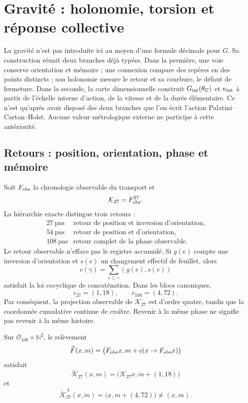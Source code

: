 \chapter{Gravité : holonomie, torsion et réponse collective}
\label{chap:gravedad}

La gravité n'est pas introduite ici au moyen d'une formule décimale pour \(G\).
Sa construction réunit deux branches déjà typées. Dans la première, une voie conserve
orientation et mémoire ; une connexion compare des repères en des points distincts ; son
holonomie mesure le retour et sa courbure, le défaut de fermeture. Dans la seconde,
la carte dimensionnelle construit \(G_{\rm int}(\theta_G)\) et
\(\kappa_{\rm int}\) à partir de l'échelle interne d'action, de la vitesse et
de la durée élémentaire. Ce n'est qu'après avoir disposé des deux branches que l'on écrit
l'action Palatini--Cartan--Holst. Aucune valeur métrologique externe ne participe à
cette antériorité.

\section{Retours : position, orientation, phase et mémoire}

Soit \(F_{\rm obs}\) la chronologie observable du transport et
\[
 \mathcal K_{27}=F_{\rm obs}^{27}.
\]
La hiérarchie exacte distingue trois retours :
\[
 \begin{array}{c|c}
 27\ \text{pas}&
 \text{retour de position et inversion d’orientation},\\
 54\ \text{pas}&
 \text{retour de position et d’orientation},\\
 108\ \text{pas}&
 \text{retour complet de la phase observable}.
 \end{array}
\]
Le retour observable n'efface pas le registre accumulé. Si \(g(e)\) compte
une inversion d'orientation et \(s(e)\) un changement effectif de feuillet, alors
\[
 c(\gamma)=\sum_{e\subset\gamma}(g(e),s(e))
\]
satisfait la loi cocyclique de concaténation. Dans les blocs canoniques,
\[
 c_{27}=(1,18),\qquad c_{108}=(4,72).
\]
Par conséquent, la projection observable de \(\mathcal K_{27}\) est d'ordre
quatre, tandis que la coordonnée cumulative continue de croître. Revenir à la
même phase ne signifie pas revenir à la même histoire.

\begin{theorem}
\label{thm:cobertura-retorno-grav-rev6}
Sur \(\mathcal O_{108}\times\mathbb N^2\), le relèvement
\[
 \widetilde F(x,m)=
 \bigl(F_{\rm obs}x,m+c(x\to F_{\rm obs}x)\bigr)
\]
satisfait
\[
 \widetilde{\mathcal K}_{27}(x,m)
 =\bigl(\mathcal K_{27}x,m+(1,18)\bigr)
\]
et
\[
 \widetilde{\mathcal K}_{27}^{\,4}(x,m)
 =\bigl(x,m+(4,72)\bigr)\neq(x,m).
\]
\end{theorem}

